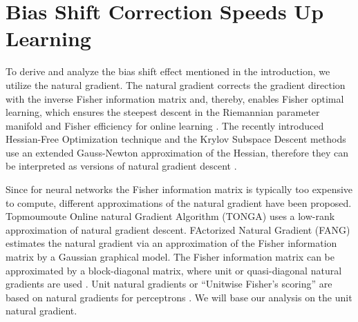 \documentclass{article}
\begin{document}
\section{Bias Shift Correction Speeds Up Learning}
\label{sec:naturalGradient}
To derive and analyze the bias shift effect mentioned in
the introduction, we utilize the natural gradient.
The natural gradient corrects the gradient direction with
the inverse Fisher information matrix and, thereby, enables
Fisher optimal learning, which ensures
the steepest descent in the Riemannian parameter manifold
and Fisher efficiency for online learning \citep{Amari:98}.
The recently introduced Hessian-Free Optimization
technique \citep{Martens:10}
and the Krylov Subspace Descent methods \citep{Vinyals:12}
use an extended Gauss-Newton approximation of the Hessian,
therefore they can be interpreted as versions of natural
gradient descent \citep{Pascanu:14}.


Since for neural networks the
Fisher information matrix is typically too expensive to compute,
different approximations
of the natural gradient have been proposed.
Topmoumoute Online natural Gradient
Algorithm (TONGA) \citep{LeRoux:08} uses a
low-rank approximation of natural gradient descent.
FActorized Natural Gradient (FANG) \citep{Grosse:15}
estimates the natural gradient via an approximation of
the Fisher information matrix by a Gaussian graphical model.
The Fisher information matrix can be approximated by a block-diagonal matrix,
where unit or quasi-diagonal natural gradients are used \citep{Olivier:13}.
Unit natural gradients or ``Unitwise Fisher's scoring'' \citep{Kurita:93}
are based on natural gradients for perceptrons \citep{Amari:98,Yang:98}.
We will base our analysis on the unit natural gradient.
\end{document}
